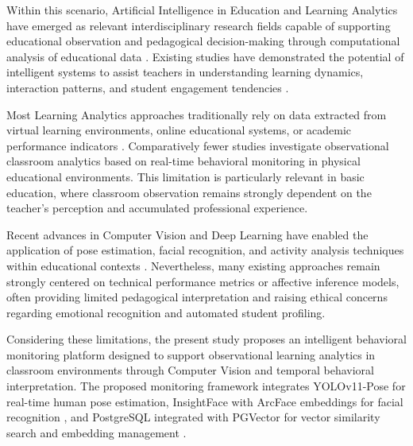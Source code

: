 \documentclass[12pt,a4paper]{article}
\begin{document}
Within this scenario, Artificial Intelligence in Education and Learning Analytics have emerged as relevant interdisciplinary research fields capable of supporting educational observation and pedagogical decision-making through computational analysis of educational data \cite{zhangSmartClassroomsHow2024,zhangAreThereFundamental2024}. Existing studies have demonstrated the potential of intelligent systems to assist teachers in understanding learning dynamics, interaction patterns, and student engagement tendencies \cite{chenStudentBehaviorDetection2023,huRealTimeClassroomBehavior2024}.

Most Learning Analytics approaches traditionally rely on data extracted from virtual learning environments, online educational systems, or academic performance indicators \cite{araComprehensiveSurveyLearning2023}. Comparatively fewer studies investigate observational classroom analytics based on real-time behavioral monitoring in physical educational environments. This limitation is particularly relevant in basic education, where classroom observation remains strongly dependent on the teacher's perception and accumulated professional experience.

Recent advances in Computer Vision and Deep Learning have enabled the application of pose estimation, facial recognition, and activity analysis techniques within educational contexts \cite{liangYOLObasedBehaviorDetection2025,liRealTimeClassroomBehavior2025}. Nevertheless, many existing approaches remain strongly centered on technical performance metrics or affective inference models, often providing limited pedagogical interpretation and raising ethical concerns regarding emotional recognition and automated student profiling.

Considering these limitations, the present study proposes an intelligent behavioral monitoring platform designed to support observational learning analytics in classroom environments through Computer Vision and temporal behavioral interpretation. The proposed monitoring framework integrates YOLOv11-Pose for real-time human pose estimation, InsightFace with ArcFace embeddings for facial recognition \cite{dengArcFaceAdditiveAngular,anKillingTwoBirds2022,nRealTimeFace2023}, and PostgreSQL integrated with PGVector for vector similarity search and embedding management \cite{zhangAreThereFundamental2024,panSurveyVectorDatabase2024}.
\end{document}
